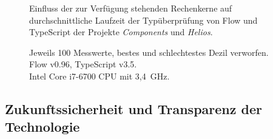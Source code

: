 
\begin{figure}[tbp]
  \centering

  

  \vspace{.5\baselineskip}

  
  \vspace{.5\baselineskip}
  \caption[Einfluss der zur Verfügung stehenden Rechenkerne auf durchschnittliche Laufzeit der Typüberprüfung von Flow und TypeScript]{
    Einfluss der zur Verfügung stehenden Rechenkerne auf durchschnittliche Laufzeit der Typüberprüfung von Flow und TypeScript der Projekte \textit{Components} und \textit{Helios}.
  }

  \vspace{\baselineskip}
  \caption*{
    \small
    Jeweils 100 Messwerte, bestes und schlechtestes Dezil verworfen.\\
    Flow v0.96, TypeScript v3.5.\\
    Intel Core i7-6700 CPU mit 3,4~GHz.
  }
\end{figure}


\subsection{Zukunftssicherheit und Transparenz der Technologie}

